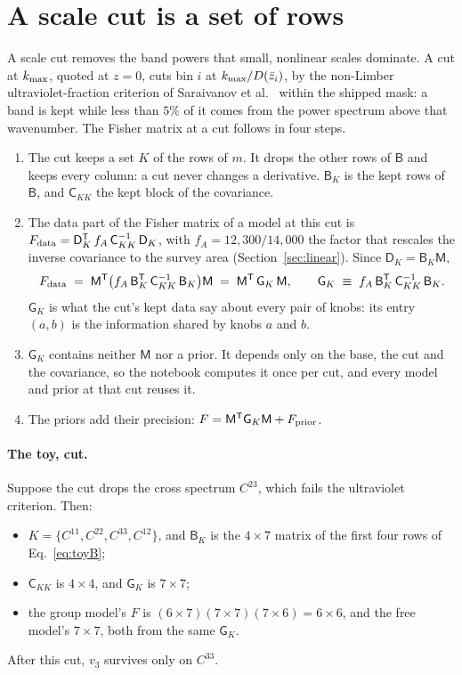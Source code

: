\documentclass[11pt]{article}
\newcommand{\Cov}{\mathsf{C}}
\newcommand{\T}{^{\mathsf{T}}}
\newcommand{\kmax}{k_{\rm max}}
\newcommand{\mB}{\mathsf{B}}
\newcommand{\mM}{\mathsf{M}}
\newcommand{\mD}{\mathsf{D}}
\newcommand{\mG}{\mathsf{G}}
\begin{document}
\section{A scale cut is a set of rows}
\label{sec:cuts}

A scale cut removes the band powers that small, nonlinear scales
dominate.  A cut at $\kmax$, quoted at $z = 0$, cuts bin $i$ at
$\kmax/D(\bar{z}_i)$, by the non-Limber ultraviolet-fraction criterion of
Saraivanov et al.~\cite{Saraivanov2026} within the shipped mask: a band
is kept while less than $5\%$ of it comes from the power spectrum above
that wavenumber.  The Fisher matrix at a cut follows in four steps.
\begin{enumerate}
  \item The cut keeps a set $K$ of the rows of $m$.  It drops the other
    rows of $\mB$ and keeps every column: a cut never changes a
    derivative.  $\mB_K$ is the kept rows of $\mB$, and $\Cov_{KK}$ the
    kept block of the covariance.
  \item The data part of the Fisher matrix of a model at this cut is
    $F_{\rm data} = \mD_K\T\, f_A\,\Cov_{KK}^{-1}\, \mD_K$, with
    $f_A = 12{,}300/14{,}000$ the factor that rescales the inverse
    covariance to the survey area (Section~\ref{sec:linear}).  Since
    $\mD_K = \mB_K\mM$,
    \begin{equation}
      F_{\rm data} \;=\; \mM\T \bigl(f_A\,\mB_K\T\,\Cov_{KK}^{-1}\,\mB_K\bigr)\mM
      \;=\; \mM\T\, \mG_K\, \mM ,
      \qquad
      \mG_K \;\equiv\; f_A\, \mB_K\T\, \Cov_{KK}^{-1}\, \mB_K .
      \label{eq:fdata}
    \end{equation}
    $\mG_K$ is what the cut's kept data say about every pair of knobs:
    its entry $(a, b)$ is the information shared by knobs $a$ and $b$.
  \item $\mG_K$ contains neither $\mM$ nor a prior.  It depends only on
    the base, the cut and the covariance, so the notebook computes it
    once per cut, and every model and prior at that cut reuses it.
  \item The priors add their precision:
    $F = \mM\T\mG_K\mM + F_{\rm prior}$.
\end{enumerate}

\paragraph{The toy, cut.}
Suppose the cut drops the cross spectrum $C^{23}$, which fails the
ultraviolet criterion.  Then:
\begin{itemize}
  \item $K = \{C^{11}, C^{22}, C^{33}, C^{12}\}$, and $\mB_K$ is the
    $4 \times 7$ matrix of the first four rows of Eq.~\eqref{eq:toyB};
  \item $\Cov_{KK}$ is $4 \times 4$, and $\mG_K$ is $7 \times 7$;
  \item the group model's $F$ is
    $(6 \times 7)(7 \times 7)(7 \times 6) = 6 \times 6$, and the free
    model's $7 \times 7$, both from the same $\mG_K$.
\end{itemize}
After this cut, $v_3$ survives only on $C^{33}$.
\end{document}
